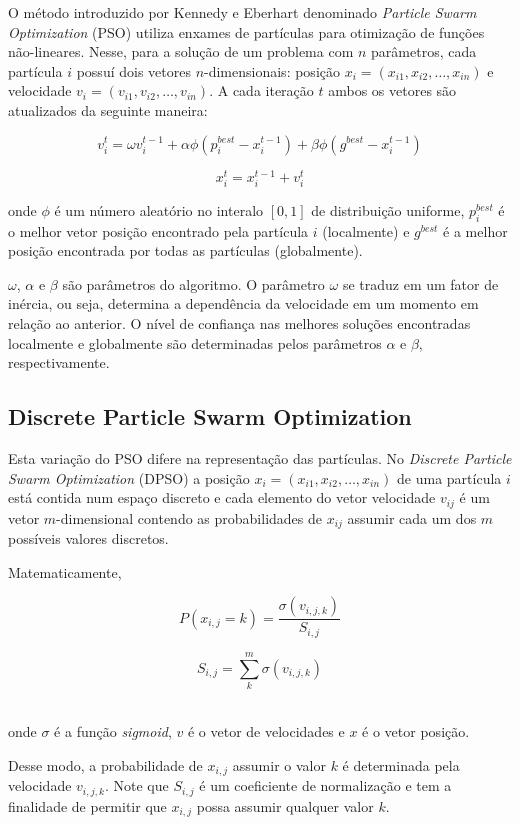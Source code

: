 O método introduzido por Kennedy e Eberhart \cite{kennedy1995pso} denominado \textit{Particle Swarm Optimization} (PSO) utiliza enxames de partículas para otimização de funções não-lineares. Nesse, para a solução de um problema com $n$ parâmetros, cada partícula $i$ possuí dois vetores $n$-dimensionais: posição $x_{i} = (x_{i1}, x_{i2}, \dots, x_{in})$ e velocidade $v_{i} = (v_{i1}, v_{i2}, \dots, v_{in})$. A cada iteração $t$ ambos os vetores são atualizados da seguinte maneira:

\begin{equation}
\label{eq:pso-vel}
v_{i}^{t} = \omega v_{i}^{t-1} + \alpha \phi (p_{i}^{best} - x_{i}^{t-1}) + \beta \phi (g^{best} - x_{i}^{t-1})
\end{equation}

\begin{equation}
\label{eq:pso-pos}
x_{i}^{t} = x_{i}^{t-1} + v_{i}^{t}
\end{equation}

onde $\phi$ é um número aleatório no interalo $[0,1]$ de distribuição uniforme, $p_{i}^{best}$ é o melhor vetor posição encontrado pela partícula $i$ (localmente) e $g^{best}$ é a melhor posição encontrada por todas as partículas (globalmente).

$\omega$, $\alpha$ e $\beta$ são parâmetros do algoritmo. O parâmetro $\omega$ se traduz em um fator de inércia, ou seja, determina a dependência da velocidade em um momento em relação ao anterior. O nível de confiança nas melhores soluções encontradas localmente e globalmente são determinadas pelos parâmetros $\alpha$ e $\beta$, respectivamente.

\subsection{Discrete Particle Swarm Optimization}

Esta variação do PSO difere na representação das partículas. No \textit{Discrete Particle Swarm Optimization} (DPSO) a posição $x_{i} = (x_{i1}, x_{i2}, \dots, x_{in})$ de uma partícula $i$ está contida num espaço discreto e cada elemento do vetor velocidade $v_{ij}$ é um vetor $m$-dimensional contendo as probabilidades de $x_{ij}$ assumir cada um dos $m$ possíveis valores discretos.

Matematicamente,

\noindent\begin{minipage}{.5\linewidth}
$$
P(x_{i,j} = k) = \frac{\sigma (v_{i,j,k})}{S_{i,j}}
$$
\end{minipage}%
\begin{minipage}{.5\linewidth}
$$
S_{i,j} = \sum_{k}^{m} \sigma(v_{i,j,k})
$$
\end{minipage}\\

onde $\sigma$ é a função \textit{sigmoid}, $v$ é o vetor de velocidades e $x$ é o vetor posição.

Desse modo, a probabilidade de $x_{i,j}$ assumir o valor $k$ é determinada pela velocidade $v_{i,j,k}$. Note que $S_{i,j}$ é um coeficiente de normalização e tem a finalidade de permitir que $x_{i,j}$ possa assumir qualquer valor $k$.